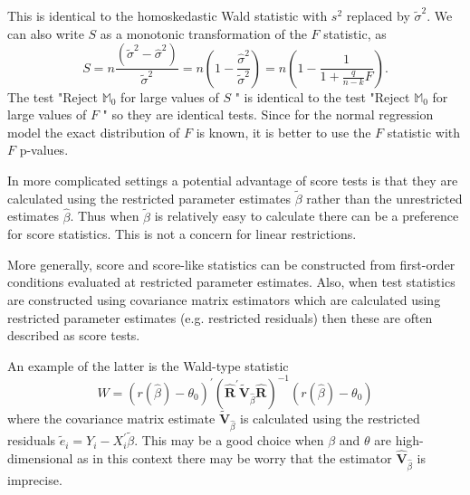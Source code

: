 \documentclass[10pt]{article}
\begin{document}
This is identical to the homoskedastic Wald statistic with $s^{2}$ replaced by $\widetilde{\sigma}^{2}$. We can also write $S$ as a monotonic transformation of the $F$ statistic, as
$$
S=n \frac{\left(\widetilde{\sigma}^{2}-\widehat{\sigma}^{2}\right)}{\widetilde{\sigma}^{2}}=n\left(1-\frac{\widehat{\sigma}^{2}}{\widetilde{\sigma}^{2}}\right)=n\left(1-\frac{1}{1+\frac{q}{n-k} F}\right) .
$$
The test "Reject $\mathbb{M}_{0}$ for large values of $S$ " is identical to the test "Reject $\mathbb{M}_{0}$ for large values of $F$ " so they are identical tests. Since for the normal regression model the exact distribution of $F$ is known, it is better to use the $F$ statistic with $F$ p-values.

In more complicated settings a potential advantage of score tests is that they are calculated using the restricted parameter estimates $\widetilde{\beta}$ rather than the unrestricted estimates $\widehat{\beta}$. Thus when $\widetilde{\beta}$ is relatively easy to calculate there can be a preference for score statistics. This is not a concern for linear restrictions.

More generally, score and score-like statistics can be constructed from first-order conditions evaluated at restricted parameter estimates. Also, when test statistics are constructed using covariance matrix estimators which are calculated using restricted parameter estimates (e.g. restricted residuals) then these are often described as score tests.

An example of the latter is the Wald-type statistic
$$
W=\left(r(\widehat{\beta})-\theta_{0}\right)^{\prime}\left(\widehat{\boldsymbol{R}}^{\prime} \widetilde{\boldsymbol{V}}_{\widehat{\beta}} \widehat{\boldsymbol{R}}\right)^{-1}\left(r(\widehat{\beta})-\theta_{0}\right)
$$
where the covariance matrix estimate $\widetilde{\boldsymbol{V}}_{\widehat{\beta}}$ is calculated using the restricted residuals $\widetilde{e}_{i}=Y_{i}-X_{i}^{\prime} \widetilde{\beta}$. This may be a good choice when $\beta$ and $\theta$ are high-dimensional as in this context there may be worry that the estimator $\widehat{\boldsymbol{V}}_{\widehat{\beta}}$ is imprecise.
\end{document}
